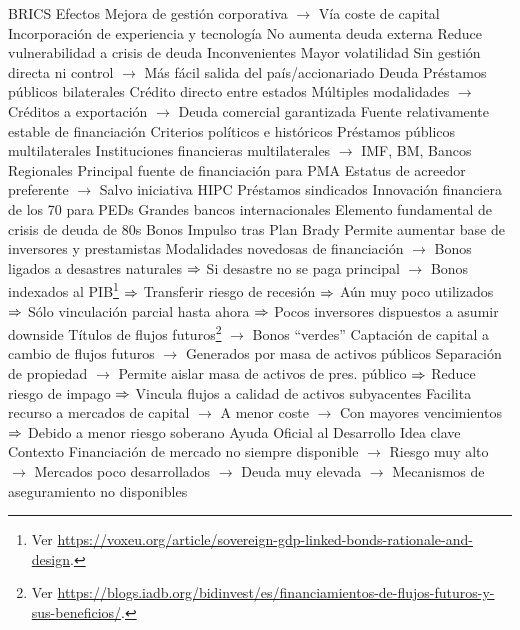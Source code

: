 \documentclass{nuevotema}
\begin{document}
\begin{esquemal}
				\4[] BRICS
				\4 Efectos
				\4[] Mejora de gestión corporativa
				\4[] $\to$ Vía coste de capital
				\4[] Incorporación de experiencia y tecnología
				\4[] No aumenta deuda externa
				\4[] Reduce vulnerabilidad a crisis de deuda
				\4 Inconvenientes
				\4[] Mayor volatilidad
				\4[] Sin gestión directa ni control
				\4[] $\to$ Más fácil salida del país/accionariado
			\3 Deuda
				\4 Préstamos públicos bilaterales
				\4[] Crédito directo entre estados
				\4[] Múltiples modalidades
				\4[] $\to$ Créditos a exportación
				\4[] $\to$ Deuda comercial garantizada
				\4[] Fuente relativamente estable de financiación
				\4[] Criterios políticos e históricos
				\4 Préstamos públicos multilaterales
				\4[] Instituciones financieras multilaterales
				\4[] $\to$ IMF, BM, Bancos Regionales
				\4[] Principal fuente de financiación para PMA
				\4[] Estatus de acreedor preferente
				\4[] $\to$ Salvo iniciativa HIPC
				\4 Préstamos sindicados
				\4[] Innovación financiera de los 70 para PEDs
				\4[] Grandes bancos internacionales
				\4[] Elemento fundamental de crisis de deuda de 80s
				\4 Bonos
				\4[] Impulso tras Plan Brady
				\4[] Permite aumentar base de inversores y prestamistas
				\4[] Modalidades novedosas de financiación
				\4[] $\to$ Bonos ligados a desastres naturales
				\4[] $\Rightarrow$ Si desastre no se paga principal
				\4[] $\to$ Bonos indexados al PIB\footnote{Ver \url{https://voxeu.org/article/sovereign-gdp-linked-bonds-rationale-and-design}.}
				\4[] $\Rightarrow$ Transferir riesgo de recesión
				\4[] $\Rightarrow$ Aún muy poco utilizados
				\4[] $\Rightarrow$ Sólo vinculación parcial hasta ahora
				\4[] $\Rightarrow$ Pocos inversores dispuestos a asumir downside
				\4 Títulos de flujos futuros\footnote{Ver \url{https://blogs.iadb.org/bidinvest/es/financiamientos-de-flujos-futuros-y-sus-beneficios/}.}
				\4[] $\to$ Bonos ``verdes''
				\4[] Captación de capital a cambio de flujos futuros
				\4[] $\to$ Generados por masa de activos públicos
				\4[] Separación de propiedad
				\4[] $\to$ Permite aislar masa de activos de pres. público
				\4[] $\Rightarrow$ Reduce riesgo de impago
				\4[] $\Rightarrow$ Vincula flujos a calidad de activos subyacentes
				\4[] Facilita recurso a mercados de capital
				\4[] $\to$ A menor coste
				\4[] $\to$ Con mayores vencimientos
				\4[] $\Rightarrow$ Debido a menor riesgo soberano
		\2 Ayuda Oficial al Desarrollo
			\3 Idea clave
				\4 Contexto
				\4[] Financiación de mercado no siempre disponible
				\4[] $\to$ Riesgo muy alto
				\4[] $\to$ Mercados poco desarrollados
				\4[] $\to$ Deuda muy elevada
				\4[] $\to$ Mecanismos de aseguramiento no disponibles

\end{esquemal}
\end{document}
